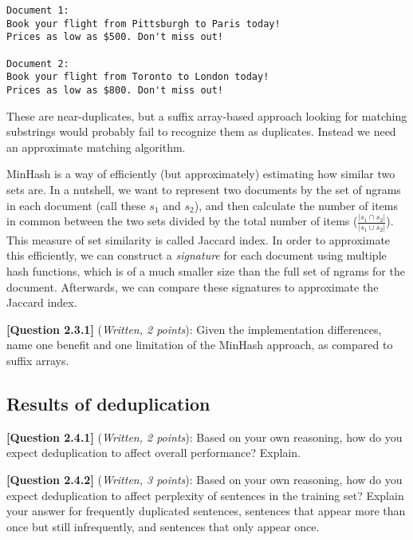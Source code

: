 \documentclass[leqno,12pt]{article}
\begin{document}
{\small
\begin{verbatim}
Document 1:
Book your flight from Pittsburgh to Paris today! 
Prices as low as $500. Don't miss out!

Document 2:
Book your flight from Toronto to London today! 
Prices as low as $800. Don't miss out!
\end{verbatim}
}

\noindent These are near-duplicates, but a suffix array-based approach looking for matching substrings would probably fail to recognize them as duplicates.
Instead we need an approximate matching algorithm.

MinHash is a way of efficiently (but approximately) estimating how similar two sets are. In a nutshell, we want to represent two documents by the set of ngrams in each document (call these $s_1$ and $s_2$), and then calculate the number of items in common between the two sets divided by the total number of items ($\frac{|s_1 \cap s_2|}{|s_1 \cup s_2|}$).
This measure of set similarity is called Jaccard index. In order to approximate this efficiently, we can construct a \textit{signature} for each document using multiple hash functions, which is of a much smaller size than the full set of ngrams for the document. Afterwards, we can compare these signatures to approximate the Jaccard index. 


\noindent \textbf{[Question 2.3.1]} (\emph{Written, 2 points}): Given the implementation differences, name one benefit and one limitation of the MinHash approach, as compared to suffix arrays. 
\begin{tcolorbox}[fit,height=2cm, width=\linewidth, blank, borderline={1pt}{-2pt}]
\end{tcolorbox}
\subsection{Results of deduplication}

\noindent \textbf{[Question 2.4.1]} (\emph{Written, 2 points}): Based on your own reasoning, how do you expect deduplication to affect overall performance? Explain. 
\begin{tcolorbox}[fit,height=2cm, width=\linewidth, blank, borderline={1pt}{-2pt}]
\end{tcolorbox}

\noindent \textbf{[Question 2.4.2]} (\emph{Written, 3 points}): Based on your own reasoning, how do you expect deduplication to affect perplexity of sentences in the training set? Explain your answer for frequently duplicated sentences, sentences that appear more than once but still infrequently, and sentences that only appear once.
\end{document}
